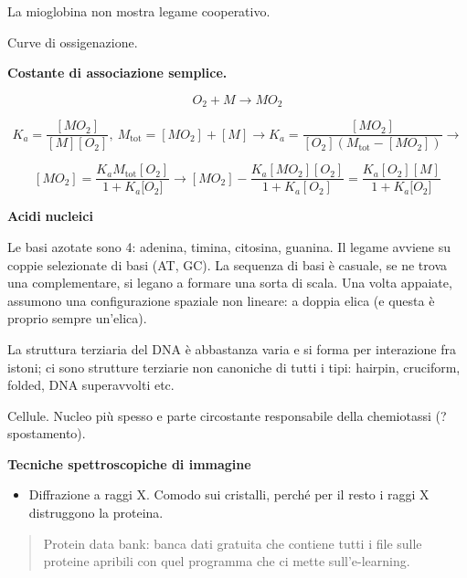 La mioglobina non mostra legame cooperativo.

Curve di ossigenazione.

\textbf{Costante di associazione semplice. }

\[O_{2} + M \rightarrow MO_{2}\]

\[K_{a} = \frac{\left\lbrack MO_{2} \right\rbrack}{\left\lbrack M \right\rbrack\left\lbrack O_{2} \right\rbrack},\ M_{\text{tot}} = \left\lbrack MO_{2} \right\rbrack + \left\lbrack M \right\rbrack \rightarrow K_{a} = \frac{\left\lbrack MO_{2} \right\rbrack}{\left\lbrack O_{2} \right\rbrack\left( M_{\text{tot}} - \left\lbrack MO_{2} \right\rbrack \right)} \rightarrow\]

\[\left\lbrack MO_{2} \right\rbrack = \frac{K_{a}M_{\text{tot}}\left\lbrack O_{2} \right\rbrack}{1 + K_{a}\lbrack O_{2}\rbrack} \rightarrow \left\lbrack MO_{2} \right\rbrack - \frac{K_{a}\left\lbrack MO_{2} \right\rbrack\left\lbrack O_{2} \right\rbrack}{1 + K_{a}\left\lbrack O_{2} \right\rbrack} = \frac{K_{a}\left\lbrack O_{2} \right\rbrack\left\lbrack M \right\rbrack}{1 + K_{a}\lbrack O_{2}\rbrack}\]

\textbf{Acidi} \textbf{nucleici}

Le basi azotate sono 4: adenina, timina, citosina, guanina. Il legame
avviene su coppie selezionate di basi (AT, GC). La sequenza di basi è
casuale, se ne trova una complementare, si legano a formare una sorta di
scala. Una volta appaiate, assumono una configurazione spaziale non
lineare: a doppia elica (e questa è proprio sempre un'elica).

La struttura terziaria del DNA è abbastanza varia e si forma per
interazione fra istoni; ci sono strutture terziarie non canoniche di
tutti i tipi: hairpin, cruciform, folded, DNA superavvolti etc.

Cellule. Nucleo più spesso e parte circostante responsabile della
chemiotassi (? spostamento).

\textbf{Tecniche spettroscopiche di immagine}

\begin{itemize}
\item
  Diffrazione a raggi X. Comodo sui cristalli, perché per il resto i
  raggi X distruggono la proteina.
\end{itemize}

\begin{quote}
Protein data bank: banca dati gratuita che contiene tutti i file sulle
proteine apribili con quel programma che ci mette sull'e-learning.
\end{quote}

